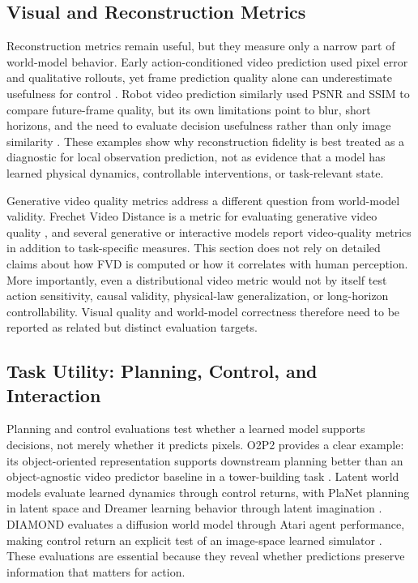 \subsection{Visual and Reconstruction Metrics}

Reconstruction metrics remain useful, but they measure only a narrow part of world-model behavior. Early action-conditioned video prediction used pixel error and qualitative rollouts, yet frame prediction quality alone can underestimate usefulness for control \cite{oh2015_action_conditional_video_prediction_prov}. Robot video prediction similarly used PSNR and SSIM to compare future-frame quality, but its own limitations point to blur, short horizons, and the need to evaluate decision usefulness rather than only image similarity \cite{finn2016_physical_interaction_video_prediction_prov}. These examples show why reconstruction fidelity is best treated as a diagnostic for local observation prediction, not as evidence that a model has learned physical dynamics, controllable interventions, or task-relevant state.

Generative video quality metrics address a different question from world-model validity. Frechet Video Distance is a metric for evaluating generative video quality \cite{unterthiner2018_fvd_prov}, and several generative or interactive models report video-quality metrics in addition to task-specific measures. This section does not rely on detailed claims about how FVD is computed or how it correlates with human perception. More importantly, even a distributional video metric would not by itself test action sensitivity, causal validity, physical-law generalization, or long-horizon controllability. Visual quality and world-model correctness therefore need to be reported as related but distinct evaluation targets.

\subsection{Task Utility: Planning, Control, and Interaction}

Planning and control evaluations test whether a learned model supports decisions, not merely whether it predicts pixels. O2P2 provides a clear example: its object-oriented representation supports downstream planning better than an object-agnostic video predictor baseline in a tower-building task \cite{janner2019_o2p2_prov}. Latent world models evaluate learned dynamics through control returns, with PlaNet planning in latent space and Dreamer learning behavior through latent imagination \cite{hafner2019_planet_prov,hafner2020_dreamer_prov}. DIAMOND evaluates a diffusion world model through Atari agent performance, making control return an explicit test of an image-space learned simulator \cite{alonso2024_diamond_prov}. These evaluations are essential because they reveal whether predictions preserve information that matters for action.

